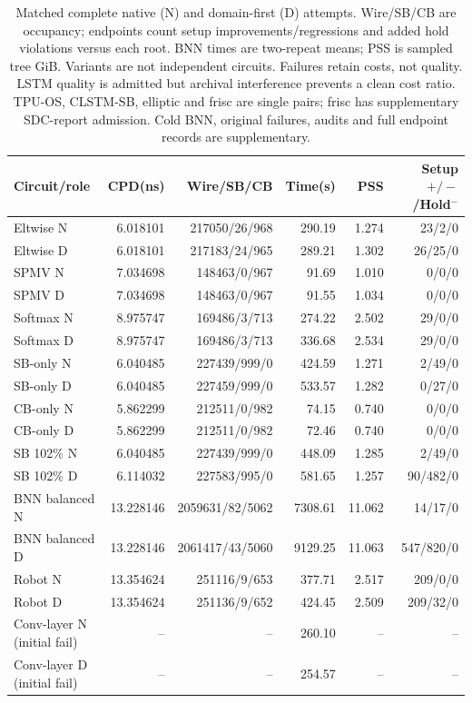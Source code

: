 \documentclass[conference,10pt]{IEEEtran}
\begin{document}
\begin{table}[t]
\centering\footnotesize\setlength{\tabcolsep}{3pt}
\caption{Matched complete native (N) and domain-first (D) attempts. Wire/SB/CB are occupancy; endpoints count setup improvements/regressions and added hold violations versus each root. BNN times are two-repeat means; PSS is sampled tree GiB. Variants are not independent circuits. Failures retain costs, not quality. LSTM quality is admitted but archival interference prevents a clean cost ratio. TPU-OS, CLSTM-SB, elliptic and frisc are single pairs; frisc has supplementary SDC-report admission. Cold BNN, original failures, audits and full endpoint records are supplementary.}
\label{tab:completecost}
\begin{tabular}{lrrrrr}\hline
Circuit/role & CPD(ns) & Wire/SB/CB & Time(s) & PSS & Setup $+/-$/Hold$^-$\\\hline
Eltwise N&6.018101&217050/26/968&290.19&1.274&23/2/0\\
Eltwise D&6.018101&217183/24/965&289.21&1.302&26/25/0\\
SPMV N&7.034698&148463/0/967&91.69&1.010&0/0/0\\
SPMV D&7.034698&148463/0/967&91.55&1.034&0/0/0\\
Softmax N&8.975747&169486/3/713&274.22&2.502&29/0/0\\
Softmax D&8.975747&169486/3/713&336.68&2.534&29/0/0\\
SB-only N&6.040485&227439/999/0&424.59&1.271&2/49/0\\
SB-only D&6.040485&227459/999/0&533.57&1.282&0/27/0\\
CB-only N&5.862299&212511/0/982&74.15&0.740&0/0/0\\
CB-only D&5.862299&212511/0/982&72.46&0.740&0/0/0\\
SB 102\% N&6.040485&227439/999/0&448.09&1.285&2/49/0\\
SB 102\% D&6.114032&227583/995/0&581.65&1.257&90/482/0\\
BNN balanced N&13.228146&2059631/82/5062&7308.61&11.062&14/17/0\\
BNN balanced D&13.228146&2061417/43/5060&9129.25&11.063&547/820/0\\
Robot N&13.354624&251116/9/653&377.71&2.517&209/0/0\\
Robot D&13.354624&251136/9/652&424.45&2.509&209/32/0\\
Conv-layer N (initial fail)&--&--&260.10&--&--\\
Conv-layer D (initial fail)&--&--&254.57&--&--\\

\end{tabular}
\end{table}
\end{document}
